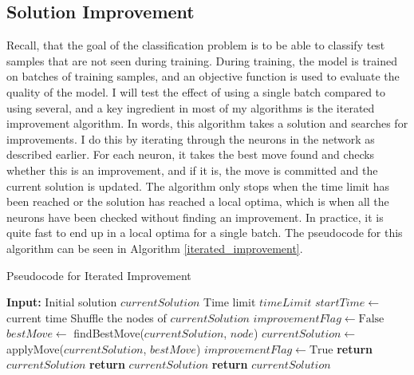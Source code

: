 \subsection{Solution Improvement}
Recall, that the goal of the classification problem is to be able to classify test samples that are not seen during training. During training, the model is trained on batches of training samples, and an objective function is used to evaluate the quality of the model. I will test the effect of using a single batch compared to using several, and a key ingredient in most of my algorithms is the iterated improvement algorithm. In words, this algorithm takes a solution and searches for improvements. I do this by iterating through the neurons in the network as described earlier. For each neuron, it takes the best move found and checks whether this is an improvement, and if it is, the move is committed and the current solution is updated. The algorithm only stops when the time limit has been reached or the solution has reached a local optima, which is when all the neurons have been checked without finding an improvement. In practice, it is quite fast to end up in a local optima for a single batch. The pseudocode for this algorithm can be seen in Algorithm \ref{iterated_improvement}. \\

\begin{algorithm}[!tb]
    \caption{Pseudocode for Iterated Improvement} \label{iterated_improvement}
    \begin{algorithmic}[1] 
        \State \textbf{Input:}
        \State \hspace{\algorithmicindent} Initial solution $currentSolution$
        \State \hspace{\algorithmicindent} Time limit $timeLimit$
        \State $startTime \gets$ current time
            \State Shuffle the nodes of $currentSolution$
            \State $improvementFlag \gets \text{False}$
                \State $bestMove \gets$ findBestMove($currentSolution$, $node$)
                    \State $currentSolution \gets $ applyMove($currentSolution$, $bestMove$)
                    \State $improvementFlag \gets \text{True}$
                \EndIf
                    \State \textbf{return} $currentSolution$
                \EndIf
            \EndFor
                \State \textbf{return} $currentSolution$
            \EndIf
        \EndWhile
        \State \textbf{return} $currentSolution$
    \end{algorithmic}
\end{algorithm}

